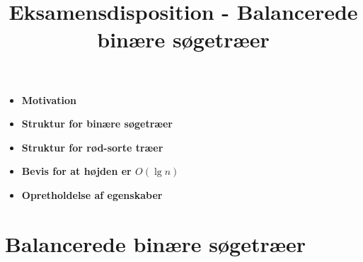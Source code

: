 
\title{Eksamensdisposition - Balancerede binære søgetræer}

\maketitle


\begin{itemize}

\item \textbf{Motivation}


\item \textbf{Struktur for binære søgetræer}


\item \textbf{Struktur for rød-sorte træer}

\item \textbf{Bevis for at højden er $O(\lg n)$}


\item \textbf{Opretholdelse af egenskaber}



\end{itemize}

\newpage
\section{Balancerede binære søgetræer}



